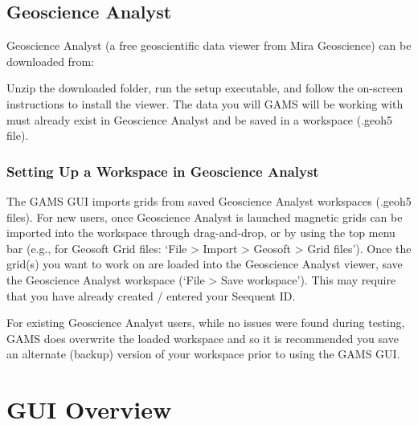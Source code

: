 \documentclass[letterpaper,10pt,english,openany,oneside]{sphinxmanual}
\begin{document}
\begin{sphinxVerbatim}[commandchars=\\\{\}]
   
\end{sphinxVerbatim}


\section{Geoscience Analyst}
\label{\detokenize{index:geoscience-analyst}}\label{\detokenize{content/getting_started/geoscience_analyst:geoscience-analyst}}
Geoscience Analyst (a free geoscientific data viewer from Mira Geoscience) can be downloaded from:


Unzip the downloaded folder, run the setup executable, and follow the on-screen instructions to install the viewer. The data you will GAMS will be working with must already exist in Geoscience Analyst and be saved in a workspace (.geoh5 file).


\subsection{Setting Up a Workspace in Geoscience Analyst}
\label{\detokenize{content/getting_started/geoscience_analyst:setting-up-a-workspace-in-geoscience-analyst}}\label{\detokenize{content/getting_started/geoscience_analyst::doc}}
The GAMS GUI imports grids from saved Geoscience Analyst workspaces (.geoh5 files).
For new users, once Geoscience Analyst is launched magnetic grids can be imported into the workspace through drag-and-drop, or by using the top menu bar (e.g., for Geosoft Grid files: ‘File \textendash{}\textgreater{} Import \textendash{}\textgreater{} Geosoft \textendash{}\textgreater{} Grid files’).
Once the grid(s) you want to work on are loaded into the Geoscience Analyst viewer, save the Geoscience Analyst workspace (‘File \textendash{}\textgreater{} Save workspace’). This may require that you have already created / entered your Seequent ID.

For existing Geoscience Analyst users, while no issues were found during testing, GAMS does overwrite the loaded workspace and so it is recommended you save an alternate (backup) version of your workspace prior to using the GAMS GUI.


\chapter{GUI Overview}
\label{\detokenize{index:gui-overview}}
\end{document}
